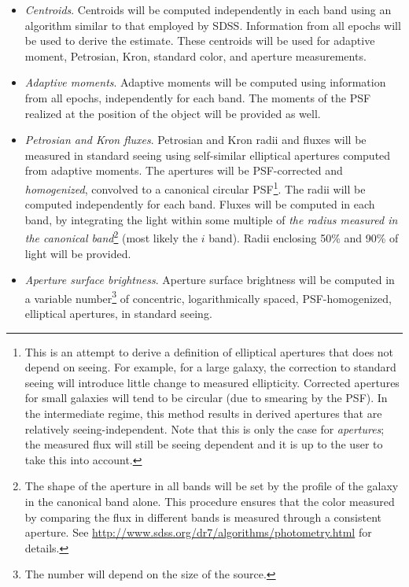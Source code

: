\documentclass[12pt]{article}
\begin{document}
\begin{itemize}
    \item {\em Centroids}. Centroids will be computed independently in each band using an algorithm similar to that employed by SDSS. Information from all epochs will be used to derive the estimate. These centroids will be used for adaptive moment, Petrosian, Kron, standard color, and aperture measurements.

    \item {\em Adaptive moments}. Adaptive moments will be computed using information from all epochs, independently for each band. The moments of the PSF realized at the position of the object will be provided as well.

    \item {\em Petrosian and Kron fluxes}. Petrosian and Kron radii and fluxes will be measured in standard seeing using self-similar elliptical apertures computed from adaptive moments. The apertures will be PSF-corrected and {\em homogenized}, convolved to a canonical circular PSF\footnote{This is an attempt to derive a definition of elliptical apertures that does not depend on seeing. For example, for a large galaxy, the correction to standard seeing will introduce little change to measured ellipticity. Corrected apertures for small galaxies will tend to be circular (due to smearing by the PSF). In the intermediate regime, this method results in derived apertures that are relatively seeing-independent. Note that this is only the case for {\em apertures}; the measured flux will still be seeing dependent and it is up to the user to take this into account.}. The radii will be computed independently for each band. Fluxes will be computed in each band, by integrating the light within some multiple of {\em the radius measured in the canonical band}\footnote{The shape of the aperture in all bands will be set by the profile of the galaxy in the canonical band alone. This procedure ensures that the color measured by comparing the flux in different bands is measured through a consistent aperture. See \url{http://www.sdss.org/dr7/algorithms/photometry.html} for details.} (most likely the $i$ band). Radii enclosing 50\% and 90\% of light will be provided.
    \item {\em Aperture surface brightness}. Aperture surface brightness will be computed in a variable number\footnote{The number will depend on the size of the source.} of concentric, logarithmically spaced, PSF-homogenized, elliptical apertures, in standard seeing.

\end{itemize}
\end{document}

